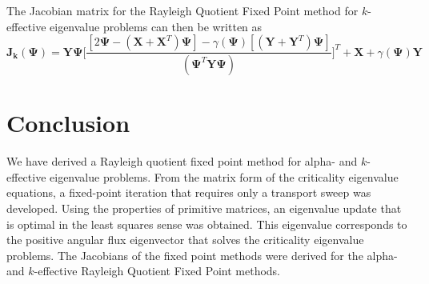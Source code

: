 The Jacobian matrix for the Rayleigh Quotient Fixed Point method for $k$-effective eigenvalue problems can then be written as
\begin{equation}
	\mathbf{J_{k}}(\mathbf{\Psi}) = \mathbf{Y\Psi} \bigg [ \frac{[2 \mathbf{\Psi} - (\mathbf{X} + \mathbf{X}^{T}) \mathbf{\Psi}]  -\gamma(\mathbf{\Psi})[(\mathbf{Y} + \mathbf{Y}^{T})\mathbf{\Psi}]}{(\mathbf{\Psi}^{T} \mathbf{Y} \mathbf{\Psi})} \bigg] ^{T} + \mathbf{X} + \gamma(\mathbf{\Psi}) \mathbf{Y}
\end{equation}

\section{Conclusion}

We have derived a Rayleigh quotient fixed point method for alpha- and $k$-effective eigenvalue problems. From the matrix form of the criticality eigenvalue equations, a fixed-point iteration that requires only a transport sweep was developed. Using the properties of primitive matrices, an eigenvalue update that is optimal in the least squares sense was obtained. This eigenvalue corresponds to the positive angular flux eigenvector that solves the criticality eigenvalue problems. The Jacobians of the fixed point methods were derived for the alpha- and $k$-effective Rayleigh Quotient Fixed Point methods.